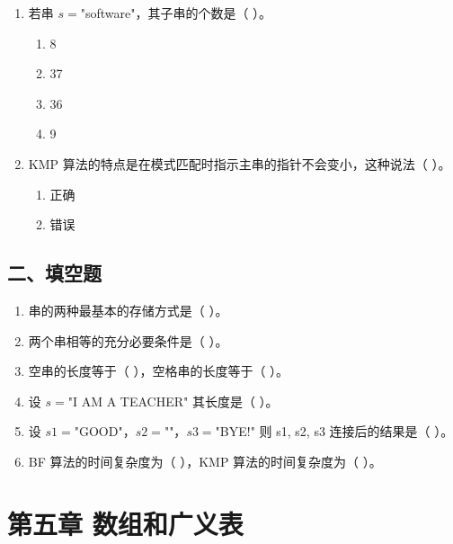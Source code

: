 \documentclass[12pt, a4paper]{article}
\begin{document}
\begin{enumerate}
    \item 若串 $s=$"software"，其子串的个数是（ ）。
    \begin{enumerate}
        \item[A.] 8
        \item[B.] 37
        \item[C.] 36
        \item[D.] 9
    \end{enumerate}
    
    \item KMP 算法的特点是在模式匹配时指示主串的指针不会变小，这种说法（ ）。
    \begin{enumerate}
        \item[A.] 正确
        \item[B.] 错误
    \end{enumerate}
\end{enumerate}

\subsection*{二、填空题}
\begin{enumerate}
    \item 串的两种最基本的存储方式是（ ）。
    \item 两个串相等的充分必要条件是（ ）。
    \item 空串的长度等于（ ），空格串的长度等于（ ）。
    \item 设 $s=$"I AM A TEACHER" 其长度是（ ）。
    \item 设 $s1=$"GOOD"，$s2=$""，$s3=$"BYE!" 则 s1, s2, s3 连接后的结果是（ ）。
    \item BF 算法的时间复杂度为（ ），KMP 算法的时间复杂度为（ ）。
\end{enumerate}

\section{第五章 数组和广义表}
\end{document}
